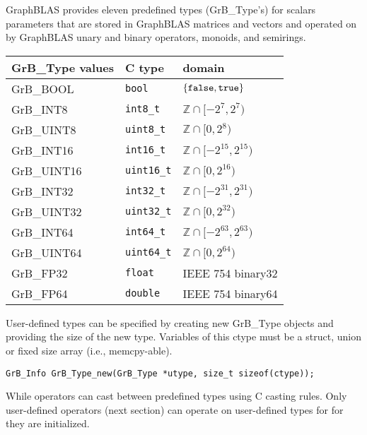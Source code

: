 \documentclass[11pt]{article}
\begin{document}

GraphBLAS provides eleven predefined types ({\sf GrB\_Type}'s) for scalars 
parameters that are stored in GraphBLAS matrices and vectors and operated on by 
GraphBLAS unary and binary operators, monoids, and semirings.

\begin{tabular}{l|l|l} \hline
{\sf GrB\_Type values} & C type            & domain \\
\hline
{\sf GrB\_BOOL}        & {\tt bool}        & $\{ {\tt false}, {\tt true} \}$  \\
{\sf GrB\_INT8}        & {\tt int8\_t}     & $\mathbb{Z} \cap [-2^{7},2^{7})$  \\
{\sf GrB\_UINT8}       & {\tt uint8\_t}    & $\mathbb{Z} \cap [0,2{^8})$  \\
{\sf GrB\_INT16}       & {\tt int16\_t}    & $\mathbb{Z} \cap [-2^{15},2^{15})$ \\
{\sf GrB\_UINT16}      & {\tt uint16\_t}   & $\mathbb{Z} \cap [0,2^{16})$ \\
{\sf GrB\_INT32}       & {\tt int32\_t}    & $\mathbb{Z} \cap [-2^{31},2^{31})$ \\
{\sf GrB\_UINT32}      & {\tt uint32\_t}   & $\mathbb{Z} \cap [0,2^{32})$ \\
{\sf GrB\_INT64}       & {\tt int64\_t}    & $\mathbb{Z} \cap [-2^{63},2^{63})$ \\
{\sf GrB\_UINT64}      & {\tt uint64\_t}   & $\mathbb{Z} \cap [0,2^{64})$ \\
{\sf GrB\_FP32}        & {\tt float}       & IEEE 754 {\sf binary32}  \\
{\sf GrB\_FP64}        & {\tt double}      & IEEE 754 {\sf binary64}  \\ \hline
\end{tabular}

User-defined types can be specified by creating new {\sf GrB\_Type} objects and 
providing the size of the new type.  Variables of this {\sf ctype} must be a 
struct, union or fixed size array (i.e., {\sf memcpy}-able).

\begin{verbatim}
GrB_Info GrB_Type_new(GrB_Type *utype, size_t sizeof(ctype));
\end{verbatim}

While operators can cast between predefined types using C casting rules. Only user-defined operators (next section) can operate on user-defined types for for they are initialized.
\end{document}
